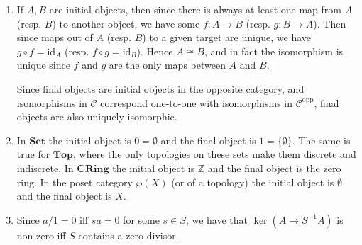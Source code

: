 \documentclass{report}
\newcommand{\cat}[1]{\mathbf{#1}} %
\newcommand{\opp}{{\mathrm{opp}}} %
\newcommand{\id}{{\mathrm{id}}} %
\newcommand{\scrC}{\mathscr{C}}
\newcommand{\Z}{\mathbb{Z}}
\begin{document}
\begin{enumerate}[label=\textbf{1.3.\Alph*.}]
	\item If $A,B$ are initial objects, then since there is always at least
	      one map from $A$ (resp. $B$) to another object, we have some
	      $f:A\to B$ (resp. $g:B\to A$). Then since maps out of $A$ (resp. $B$)
	      to a given target are unique, we have $g\circ f=\id_A$ (resp.
	      $f\circ g=\id_B$). Hence $A\cong B$, and in fact the isomorphism is
	      unique since $f$ and $g$ are the only maps between $A$ and $B$.

	      Since final objects are initial objects in the opposite category, and
	      isomorphisms in $\scrC$ correspond one-to-one with isomorphisms in
	      $\scrC^\opp$, final objects are also uniquely isomorphic.

	\item In $\cat{Set}$ the initial object is $0=\emptyset$ and the final
	      object is $1=\{\emptyset\}$. The same is true for $\cat{Top}$, where
	      the only topologies on these sets make them discrete and indiscrete.
	      In $\cat{CRing}$ the initial object is $\Z$ and the final
	      object is the zero ring. In the poset category $\wp(X)$ (or of a
	      topology) the initial object is $\emptyset$ and the final object is
	      $X$.

	\item Since $a/1=0$ iff $sa=0$ for some $s\in S$, we have that
	      $\ker(A\to S^{-1}A)$ is non-zero iff $S$ contains a zero-divisor.


\end{enumerate}
\end{document}
